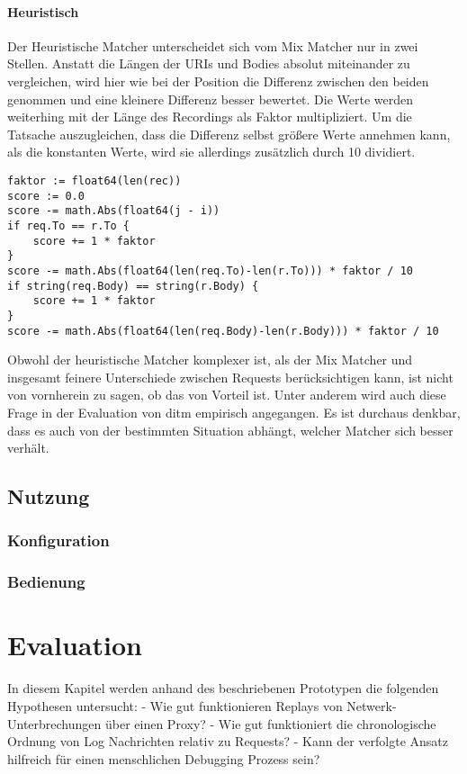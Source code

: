 \documentclass[12pt,a4paper]{report}
\begin{document}
\subsubsection{Heuristisch}
Der Heuristische Matcher unterscheidet sich vom Mix Matcher nur in zwei Stellen. Anstatt die Längen der URIs und Bodies
absolut miteinander zu vergleichen, wird hier wie bei der Position die Differenz zwischen den beiden genommen und eine kleinere
Differenz besser bewertet. Die Werte werden weiterhing mit der Länge des Recordings als Faktor multipliziert. Um die Tatsache
auszugleichen, dass die Differenz selbst größere Werte annehmen kann, als die konstanten Werte, wird sie allerdings zusätzlich
durch 10 dividiert.
\begin{verbatim}
faktor := float64(len(rec))
score := 0.0
score -= math.Abs(float64(j - i))
if req.To == r.To {
    score += 1 * faktor
}
score -= math.Abs(float64(len(req.To)-len(r.To))) * faktor / 10
if string(req.Body) == string(r.Body) {
    score += 1 * faktor
}
score -= math.Abs(float64(len(req.Body)-len(r.Body))) * faktor / 10
\end{verbatim}
Obwohl der heuristische Matcher komplexer ist, als der Mix Matcher und insgesamt feinere Unterschiede zwischen Requests
berücksichtigen kann, ist nicht von vornherein zu sagen, ob das von Vorteil ist. Unter anderem wird auch diese Frage in
der Evaluation von ditm empirisch angegangen. Es ist durchaus denkbar, dass es auch von der bestimmten Situation abhängt,
welcher Matcher sich besser verhält.
\section{Nutzung}
\subsection{Konfiguration}
\subsection{Bedienung}

\chapter{Evaluation}
In diesem Kapitel werden anhand des beschriebenen Prototypen die folgenden Hypothesen untersucht:
- Wie gut funktionieren Replays von Netwerk-Unterbrechungen über einen Proxy?
- Wie gut funktioniert die chronologische Ordnung von Log Nachrichten relativ zu Requests?
- Kann der verfolgte Ansatz hilfreich für einen menschlichen Debugging Prozess sein?
\end{document}
